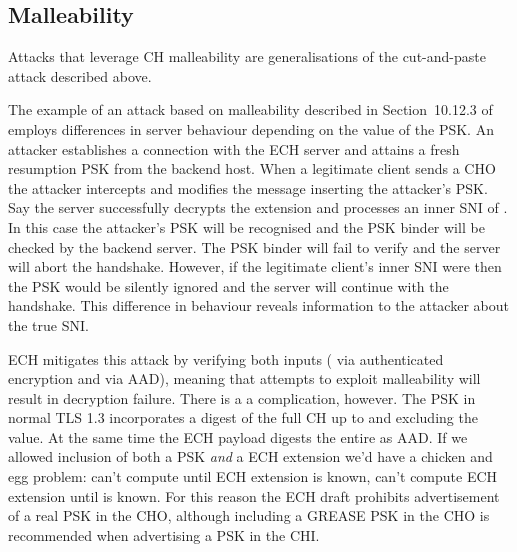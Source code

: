 


\subsection{ Malleability}
Attacks that leverage \ac{CH} malleability are generalisations of the cut-and-paste attack
described above.

The example of an attack based on  malleability described in Section~10.12.3 of \cite{esni}
employs differences in server behaviour depending on the value of the \ac{PSK}.
An attacker establishes a connection
with the \ac{ECH} server and attains a fresh resumption \ac{PSK} from the backend  host.
When a legitimate client sends a \ac{CHO}
the attacker intercepts and modifies the message inserting the attacker's \ac{PSK}.
Say the server successfully decrypts the \varech extension and processes an inner \ac{SNI} of .
In this case the attacker's \ac{PSK} will be recognised and the \ac{PSK} binder will be checked
by the backend server.
The \ac{PSK} binder will fail to verify and the server will
abort the handshake.
However, if the legitimate client's inner \ac{SNI} were  then the \ac{PSK} would be silently
ignored and the server will continue with the handshake.
This difference in behaviour reveals information to the attacker about
the true \ac{SNI}.

\ac{ECH} mitigates this attack by verifying both inputs ( via authenticated encryption and  via \ac{AAD}),
meaning that attempts to exploit malleability will result in decryption failure.
There is a a complication, however.
The \ac{PSK}  in normal \ac{TLS} 1.3 incorporates a digest of the full
\ac{CH} up to and excluding the  value.
At the same time the \ac{ECH} payload
digests the entire  as \ac{AAD}.
If we allowed inclusion of both a \ac{PSK}  {\em and}
a \ac{ECH} extension we'd have a chicken and egg problem: can't compute  until \ac{ECH} extension is known, can't
compute \ac{ECH} extension until  is known.
For this reason the \ac{ECH} draft prohibits
advertisement of a real \ac{PSK} in the \ac{CHO},
although including a \ac{GREASE} \ac{PSK} in the \ac{CHO}
is recommended when advertising a \ac{PSK} in the \ac{CHI}.

